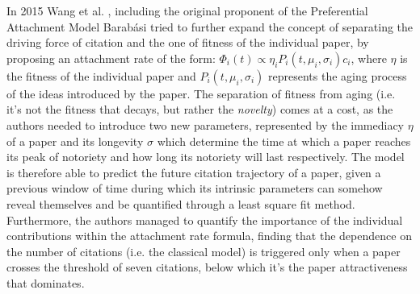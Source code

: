 In 2015 Wang et al. \cite{Wang127}, including the original proponent of the Preferential Attachment Model
Barab{\'a}si tried to further expand the concept of separating the driving force of citation and the one of fitness of the individual paper, by proposing an attachment rate of the form:
$\Phi_{i}(t) \propto \eta_{i}P_{i}(t,\mu_{i},\sigma_{i})c_{i} $, where $\eta$ is the fitness of the individual paper and $P_{i}(t,\mu_{i},\sigma_{i})$ represents the aging process of the ideas introduced by the paper. The separation of fitness
from aging (i.e. it's not the fitness that decays, but rather the \textit{novelty}) comes at a cost, as the authors needed to introduce two new parameters, represented by the immediacy $\eta$ of a paper and
its longevity $\sigma$ which determine the time at which a paper reaches its peak of notoriety and how long its notoriety will last respectively. The model is therefore able
to predict the future citation trajectory of a paper, given a previous window of time during which its intrinsic parameters can somehow reveal themselves and be quantified
through a least square fit method. Furthermore, the authors managed to quantify the importance of the individual contributions within the attachment rate formula, finding that
the dependence on the number of citations (i.e. the classical model) is triggered only when a paper crosses the threshold of seven citations, below which it's the paper attractiveness that 
dominates.


